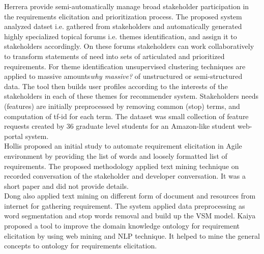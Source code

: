  
Herrera \etal \cite{Castro-Herrera:2009} provide semi-automatically manage broad stakeholder participation in the requirements elicitation
and prioritization process. The proposed system analyzed datset i.e. gathered
from stakeholders and automatically generated highly specialized topical forums
i.e. themes identification, and assign it to stakeholders accordingly.
On these forums stakeholders can work collaboratively to transform statements of
need into sets of articulated and prioritized requirements. For theme
identification unsupervised clustering techniques are applied to massive
amounts\emph{why massive?} of unstructured or semi-structured data. The tool
then builds user profiles according to the interests of the stakeholders in each
of these themes for recommender system. Stakeholders needs
(features) are initially preprocessed
by removing common (stop) terms, and computation of tf-id  for each term.
The dataset was small collection of feature requests created by 36 graduate level students for an Amazon-like student web-portal system.\\

Hollis \etal \cite{Hollis2017} proposed an initial study to automate requirement
elicitation in Agile environment by providing the list of words and loosely
formatted list of requirements. The proposed methodology applied text mining
technique on recorded conversation of the stakeholder and developer
conversation. It was a short paper and did not provide details.\\

Dong \etal \cite{dong2010} also applied text mining on different form of
document and resources from internet for gathering requirement. The system
applied data preprocessing as word segmentation and stop words removal and build
up the VSM model. Kaiya \etal \cite{Kaiya:2010} proposed a tool to improve the
domain knowledge ontology for requirement elicitation by using web mining and
NLP technique. It helped to mine the general concepts to ontology for
requirements elicitation.


